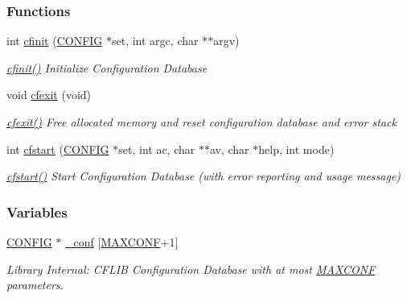 \subsubsection*{Functions}
\begin{DoxyCompactItemize}
\item 
int \hyperlink{group__cflib__core_ga64fb341565c2ddfccd6669e5e6265a8a}{cfinit} (\hyperlink{struct_c_o_n_f_i_g}{C\-O\-N\-F\-I\-G} $\ast$set, int argc, char $\ast$$\ast$argv)
\begin{DoxyCompactList}\small\item\em \hyperlink{group__cflib__core_ga64fb341565c2ddfccd6669e5e6265a8a}{cfinit()} Initialize Configuration Database \end{DoxyCompactList}\item 
void \hyperlink{group__cflib__core_ga47bfff42f432b3e8b5b9f12b695e60db}{cfexit} (void)
\begin{DoxyCompactList}\small\item\em \hyperlink{group__cflib__core_ga47bfff42f432b3e8b5b9f12b695e60db}{cfexit()} Free allocated memory and reset configuration database and error stack \end{DoxyCompactList}\item 
int \hyperlink{group__cflib__core_ga6e04a462f9ad273de914af386ff15623}{cfstart} (\hyperlink{struct_c_o_n_f_i_g}{C\-O\-N\-F\-I\-G} $\ast$set, int ac, char $\ast$$\ast$av, char $\ast$help, int mode)
\begin{DoxyCompactList}\small\item\em \hyperlink{group__cflib__core_ga6e04a462f9ad273de914af386ff15623}{cfstart()} Start Configuration Database (with error reporting and usage message) \end{DoxyCompactList}\end{DoxyCompactItemize}
\subsubsection*{Variables}
\begin{DoxyCompactItemize}
\item 
\hypertarget{group__cflib__core_ga7d0fec33ada97c2d7ef78e6c3d83da97}{\hyperlink{struct_c_o_n_f_i_g}{C\-O\-N\-F\-I\-G} $\ast$ \hyperlink{group__cflib__core_ga7d0fec33ada97c2d7ef78e6c3d83da97}{\-\_\-conf} \mbox{[}\hyperlink{group__cflib__core_ga1662beae23df229341c28d286379e2ad}{M\-A\-X\-C\-O\-N\-F}+1\mbox{]}}\label{group__cflib__core_ga7d0fec33ada97c2d7ef78e6c3d83da97}

\begin{DoxyCompactList}\small\item\em Library Internal\-: C\-F\-L\-I\-B Configuration Database with at most \hyperlink{group__cflib__core_ga1662beae23df229341c28d286379e2ad}{M\-A\-X\-C\-O\-N\-F} parameters. \end{DoxyCompactList}\end{DoxyCompactItemize}


